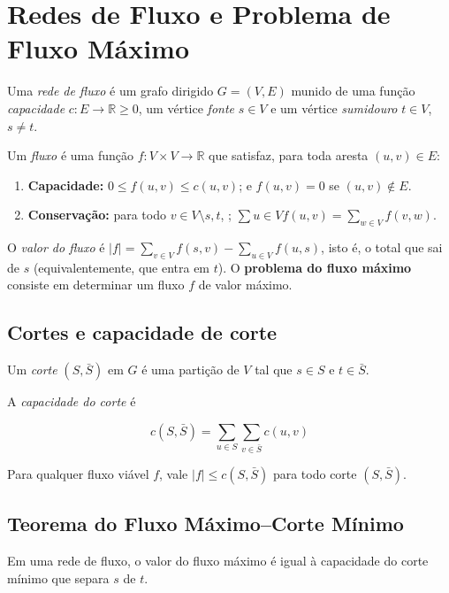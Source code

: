 \section{Redes de Fluxo e Problema de Fluxo Máximo} 

\noindent Uma \emph{rede de fluxo} é um grafo dirigido $G=(V,E)$ munido de uma função \emph{capacidade} $c: E \to \mathbb{R}{\ge 0}$, um vértice \emph{fonte} $s\in V$ e um vértice \emph{sumidouro} $t\in V$, $s\neq t$. 

\noindent Um \emph{fluxo} é uma função $f: V\times V \to \mathbb{R}$ que satisfaz, para toda aresta $(u,v)\in E$: 

\begin{enumerate}
    \item \textbf{Capacidade:} $0 \le f(u,v) \le c(u,v)$; e $f(u,v)=0$ se $(u,v)\notin E$. 
    \item \textbf{Conservação:} para todo $v\in V\setminus{s,t}$, ; $\sum\limits{u\in V} f(u,v) = \sum\limits_{w\in V} f(v,w)$. 
\end{enumerate} 
    
O \emph{valor do fluxo} é $|f| = \sum\limits_{v\in V} f(s,v) - \sum\limits_{u\in V} f(u,s)$, isto é, o total que sai de $s$ (equivalentemente, que entra em $t$). O \textbf{problema do fluxo máximo} consiste em determinar um fluxo $f$ de valor máximo.

\subsection{Cortes e capacidade de corte} 

Um \emph{corte} $(S,\bar S)$ em $G$ é uma partição de $V$ tal que $s\in S$ e $t\in \bar S$. 

A \emph{capacidade do corte} é

$$ c(S,\bar{S}) = \sum_{u \in S} \sum_{v \in \bar{S}} c(u,v) $$


Para qualquer fluxo viável $f$, vale $|f| \le c(S,\bar S)$ para todo corte $(S,\bar S)$.

\subsection{Teorema do Fluxo Máximo–Corte Mínimo} 

\begin{theorem}
 Em uma rede de fluxo, o valor do fluxo máximo é igual à capacidade do corte mínimo que separa $s$ de $t$. 
\end{theorem} 

